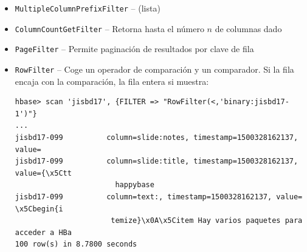 \documentclass[14pt]{beamer}
\begin{document}
\begin{frame}
\begin{itemize}
    \framebreak

\item {\tt MultipleColumnPrefixFilter} -- (lista)

\item {\tt ColumnCountGetFilter} -- Retorna hasta el número $n$ de columnas
  dado

\item {\tt PageFilter} -- Permite paginación de resultados por clave de
  fila

  \framebreak

\item {\tt RowFilter} -- Coge un operador de comparación y un comparador.
  Si la fila encaja con la comparación, la fila entera si muestra:

\begin{lstlisting}
hbase> scan 'jisbd17', {FILTER => "RowFilter(<,'binary:jisbd17-1')"}
...
jisbd17-099          column=slide:notes, timestamp=1500328162137, value=
jisbd17-099          column=slide:title, timestamp=1500328162137, value={\x5Ctt
                       happybase
jisbd17-099          column=text:, timestamp=1500328162137, value=  \x5Cbegin{i
                      temize}\x0A\x5Citem Hay varios paquetes para acceder a HBa
100 row(s) in 8.7800 seconds
\end{lstlisting}








\end{itemize}
\end{frame}
\end{document}
